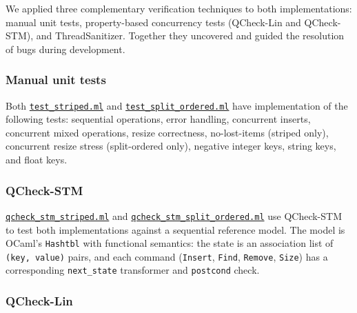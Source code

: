 \documentclass[11pt,a4paper]{article}
\begin{document}
We applied three complementary verification techniques to both implementations:
manual unit tests, property-based concurrency tests (QCheck-Lin and QCheck-STM),
and ThreadSanitizer. Together they uncovered and guided the resolution of
bugs during development.

\subsubsection{Manual unit tests}

Both \href{https://github.com/ogirala-srihasa/Concurrent-Hashmap/blob/main/test/test_striped.ml}{\texttt{test\_striped.ml}} and \href{https://github.com/ogirala-srihasa/Concurrent-Hashmap/blob/main/test/test_split_ordered.ml}{\texttt{test\_split\_ordered.ml}} have implementation of the following tests: sequential operations, error handling,
concurrent inserts, concurrent mixed operations, resize correctness,
no-lost-items (striped only), concurrent resize stress (split-ordered only),
negative integer keys, string keys, and float keys.

\subsubsection{QCheck-STM}

\href{https://github.com/ogirala-srihasa/Concurrent-Hashmap/blob/main/test/qcheck_stm_striped.ml}{\texttt{qcheck\_stm\_striped.ml}} and \href{https://github.com/ogirala-srihasa/Concurrent-Hashmap/blob/main/test/qcheck_stm_split_ordered.ml}{\texttt{qcheck\_stm\_split\_ordered.ml}}
use QCheck-STM to test both implementations against a sequential reference
model. The model is OCaml's \texttt{Hashtbl} with functional semantics: the
state is an association list of \texttt{(key, value)} pairs, and each command
(\texttt{Insert}, \texttt{Find}, \texttt{Remove}, \texttt{Size}) has a
corresponding \texttt{next\_state} transformer and \texttt{postcond} check.

\subsubsection{QCheck-Lin}
\end{document}
